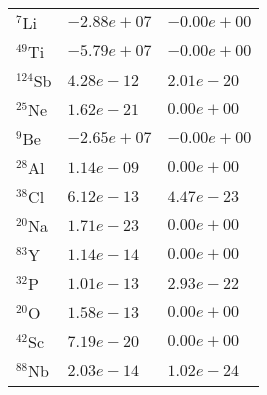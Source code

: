 \begin{tabular}{lll}
 $^{7}$Li   & $-2.88e+07 $                                                       & $-0.00e+00 $                                                                    \\
 $^{49}$Ti  & $-5.79e+07 $                                                       & $-0.00e+00 $                                                                    \\
 $^{124}$Sb & $4.28e-12 $                                                        & $2.01e-20 $                                                                     \\
 $^{25}$Ne  & $1.62e-21 $                                                        & $0.00e+00 $                                                                     \\
 $^{9}$Be   & $-2.65e+07 $                                                       & $-0.00e+00 $                                                                    \\
 $^{28}$Al  & $1.14e-09 $                                                        & $0.00e+00 $                                                                     \\
 $^{38}$Cl  & $6.12e-13 $                                                        & $4.47e-23 $                                                                     \\
 $^{20}$Na  & $1.71e-23 $                                                        & $0.00e+00 $                                                                     \\
 $^{83}$Y   & $1.14e-14 $                                                        & $0.00e+00 $                                                                     \\
 $^{32}$P   & $1.01e-13 $                                                        & $2.93e-22 $                                                                     \\
 $^{20}$O   & $1.58e-13 $                                                        & $0.00e+00 $                                                                     \\
 $^{42}$Sc  & $7.19e-20 $                                                        & $0.00e+00 $                                                                     \\
 $^{88}$Nb  & $2.03e-14 $                                                        & $1.02e-24 $                                                                     \\

\end{tabular}
